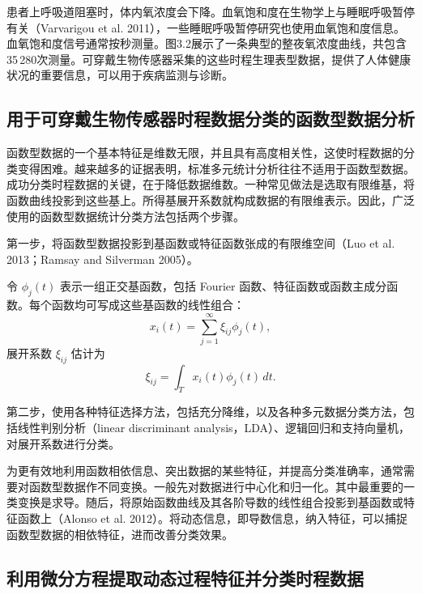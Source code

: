 患者上呼吸道阻塞时，体内氧浓度会下降。血氧饱和度在生物学上与睡眠呼吸暂停有关（Varvarigou et al. 2011），一些睡眠呼吸暂停研究也使用血氧饱和度信息。血氧饱和度信号通常按秒测量。图3.2展示了一条典型的整夜氧浓度曲线，共包含35\,280次测量。可穿戴生物传感器采集的这些时程生理表型数据，提供了人体健康状况的重要信息，可以用于疾病监测与诊断。



\FloatBarrier

\subsection{用于可穿戴生物传感器时程数据分类的函数型数据分析}

函数型数据的一个基本特征是维数无限，并且具有高度相关性，这使时程数据的分类变得困难。越来越多的证据表明，标准多元统计分析往往不适用于函数型数据。成功分类时程数据的关键，在于降低数据维数。一种常见做法是选取有限维基，将函数曲线投影到这些基上。所得基展开系数就构成数据的有限维表示。因此，广泛使用的函数型数据统计分类方法包括两个步骤。

第一步，将函数型数据投影到基函数或特征函数张成的有限维空间（Luo et al. 2013；Ramsay and Silverman 2005）。

令 $\phi_j(t)$ 表示一组正交基函数，包括 Fourier 函数、特征函数或函数主成分函数。每个函数均可写成这些基函数的线性组合：
\begin{equation}
x_i(t)=\sum_{j=1}^{\infty}\xi_{ij}\phi_j(t),
\tag{3.1}
\end{equation}
展开系数 $\xi_{ij}$ 估计为
\begin{equation}
\xi_{ij}=\int_Tx_i(t)\phi_j(t)\,dt.
\tag{3.2}
\end{equation}

第二步，使用各种特征选择方法，包括充分降维，以及各种多元数据分类方法，包括线性判别分析（linear discriminant analysis，LDA）、逻辑回归和支持向量机，对展开系数进行分类。

为更有效地利用函数相依信息、突出数据的某些特征，并提高分类准确率，通常需要对函数型数据作不同变换。一般先对数据进行中心化和归一化。其中最重要的一类变换是求导。随后，将原始函数曲线及其各阶导数的线性组合投影到基函数或特征函数上（Alonso et al. 2012）。将动态信息，即导数信息，纳入特征，可以捕捉函数型数据的相依特征，进而改善分类效果。

\subsection{利用微分方程提取动态过程特征并分类时程数据}

